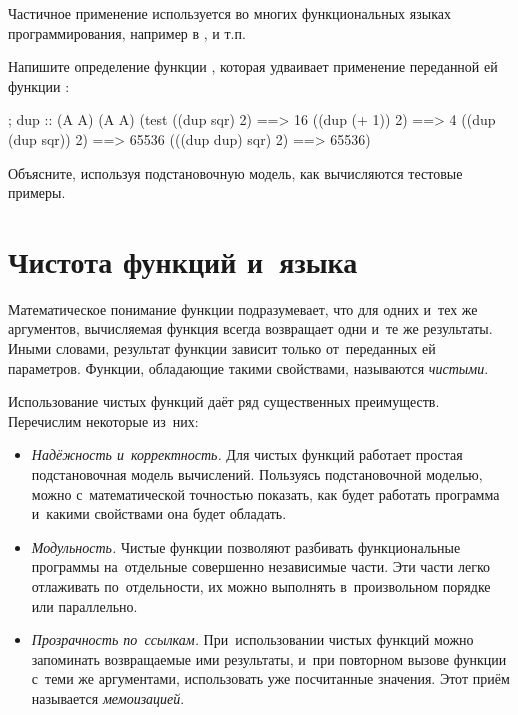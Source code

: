 Частичное применение используется во многих функциональных языках программирования, например в ,  и т.п.


\begin{Assignment}
Напишите определение функции , которая удваивает применение переданной ей функции :

\begin{Specification}[emph=x]
; dup :: (A \arrow A) \arrow (A \arrow A)
(test 
  ((dup sqr) 2)        ==> 16
  ((dup (+ 1)) 2)      ==> 4
  ((dup (dup sqr)) 2)  ==> 65536
  (((dup dup) sqr) 2)  ==> 65536)
\end{Specification}

Объясните, используя подстановочную модель, как вычисляются тестовые примеры.
\end{Assignment}

\section{Чистота функций и~языка}%
Математическое понимание функции подразумевает, что для одних и~тех же аргументов, вычисляемая функция всегда возвращает одни и~те же результаты. Иными словами, результат функции зависит только от~переданных ей параметров. Функции, обладающие такими свойствами, называются \emph{чистыми}.

Использование чистых функций даёт ряд существенных преимуществ. Перечислим некоторые из~них:

\begin{itemize}[--]
 \item \emph{Надёжность и~корректность.} Для чистых функций работает простая подстановочная модель вычислений. Пользуясь подстановочной моделью, можно с~математической точностью показать, как будет работать программа и~какими свойствами она будет обладать.

 \item \emph{Модульность.} Чистые функции позволяют разбивать функциональные программы на~отдельные совершенно независимые части. Эти части легко отлаживать по~отдельности, их можно выполнять в~произвольном порядке или параллельно.

 \item\label{memo1}\emph{Прозрачность по~ссылкам.} При~использовании чистых функций можно запоминать возвращаемые ими результаты, и~при повторном вызове функции с~теми же аргументами, использовать уже посчитанные значения. Этот приём называется \emph{мемоизацией}.
\end{itemize}

